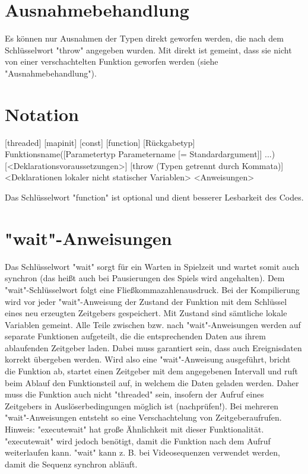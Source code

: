 \section{Ausnahmebehandlung}
Es können nur Ausnahmen der Typen direkt geworfen werden, die nach dem Schlüsselwort "throw" angegeben wurden.
Mit direkt ist gemeint, dass sie nicht von einer verschachtelten Funktion geworfen werden (siehe "Ausnahmebehandlung").

\section{Notation}
[threaded] [mapinit] [const] [function] [Rückgabetyp] Funktionsname([Parametertyp Parametername [= Standardargument]] ...) [<Deklarationsvoraussetzungen>] [throw (Typen getrennt durch Kommata)]
	<Deklarationen lokaler nicht statischer Variablen>
	<Anweisungen>

Das Schlüsselwort "function" ist optional und dient besserer Lesbarkeit des Codes.

\section{"wait"-Anweisungen}
Das Schlüsselwort "wait" sorgt für ein Warten in Spielzeit und wartet somit auch synchron (das heißt auch bei Pausierungen des Spiels wird angehalten).
Dem "wait"-Schlüsselwort folgt eine Fließkommazahlenausdruck. Bei der Kompilierung wird vor jeder "wait"-Anweisung der Zustand der Funktion mit dem Schlüssel eines neu erzeugten Zeitgebers gespeichert.
Mit Zustand sind sämtliche lokale Variablen gemeint.
Alle Teile zwischen bzw. nach "wait"-Anweisungen werden auf separate Funktionen aufgeteilt, die die entsprechenden Daten aus ihrem ablaufenden Zeitgeber laden.
Dabei muss garantiert sein, dass auch Ereignisdaten korrekt übergeben werden. Wird also eine "wait"-Anweisung ausgeführt, bricht die Funktion ab, startet einen Zeitgeber mit dem angegebenen Intervall und ruft beim Ablauf den Funktionsteil auf, in welchem die Daten geladen werden.
Daher muss die Funktion auch nicht "threaded" sein, insofern der Aufruf eines Zeitgebers in Auslöserbedingungen möglich ist (nachprüfen!).
Bei mehreren "wait"-Anweisungen entsteht so eine Verschachtelung von Zeitgeberaufrufen.
Hinweis: "executewait" hat große Ähnlichkeit mit dieser Funktionalität. "executewait" wird jedoch benötigt, damit die Funktion nach dem Aufruf weiterlaufen kann.
"wait" kann z. B. bei Videosequenzen verwendet werden, damit die Sequenz synchron abläuft.

